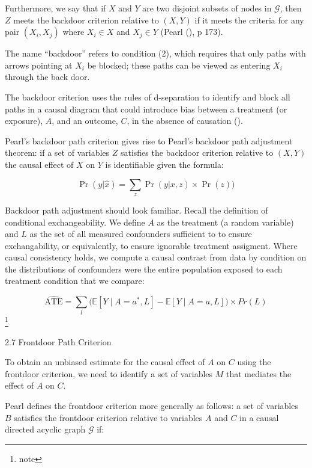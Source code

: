 \documentclass[
  single column]{article}
\makeatletter
\let\oldparagraph\paragraph
\renewcommand{\paragraph}{
    \@ifstar
      \xxxParagraphStar
      \xxxParagraphNoStar
  }
\newcommand{\xxxParagraphStar}[1]{\oldparagraph*{#1}\mbox{}}
\newcommand{\xxxParagraphNoStar}[1]{\oldparagraph{#1}\mbox{}}
\makeatother
\begin{document}
Furthermore, we say that if \(X\) and \(Y\) are two disjoint subsets of
nodes in \(\mathcal{G}\), then \(Z\) meets the backdoor criterion
relative to \((X, Y)\) if it meets the criteria for any pair
\((X_i, X_j)\) where \(X_i \in X\) and \(X_j \in Y\) (Pearl
(), p 173).

The name ``backdoor'' refers to condition (2), which requires that only
paths with arrows pointing at \(X_i\) be blocked; these paths can be
viewed as entering \(X_i\) through the back door.

The backdoor criterion uses the rules of d-separation to identify and
block all paths in a causal diagram that could introduce bias between a
treatment (or exposure), \(A\), and an outcome, \(C\), in the absence of
causation ().

Pearl's backdoor path criterion gives rise to Pearl's backdoor path
adjustment theorem: if a set of variables \(Z\) satisfies the backdoor
criterion relative to \((X, Y)\) the causal effect of \(X\) on \(Y\) is
identifiable given the formula:

\[ \Pr(y|\hat{x}) = \sum_z \Pr(y|x,z) \times \Pr(z))\]

Backdoor path adjustment should look familiar. Recall the definition of
conditional exchangeability. We define \(A\) as the treatment (a random
variable) and \(L\) as the set of all measured confounders sufficient to
to ensure exchangability, or equivalently, to ensure ignorable treatment
assigment. Where causal consistency holds, we compute a causal contrast
from data by condition on the distributions of confounders were the
entire population exposed to each treatment condition that we compare:

\[
\widehat{\text{ATE}} =  \sum_l \big( \mathbb{E}[Y \mid A = a^*, L] - \mathbb{E}[Y \mid A = a, L] \big) \times Pr(L)
\] \footnote{note}

\paragraph{2.7 Frontdoor Path Criterion}\label{frontdoor-path-criterion}

To obtain an unbiased estimate for the causal effect of \(A\) on \(C\)
using the frontdoor criterion, we need to identify a set of variables
\(M\) that mediates the effect of \(A\) on \(C\).

Pearl defines the frontdoor criterion more generally as follows: a set
of variables \(B\) satisfies the frontdoor criterion relative to
variables \(A\) and \(C\) in a causal directed acyclic graph
\(\mathcal{G}\) if:
\end{document}
